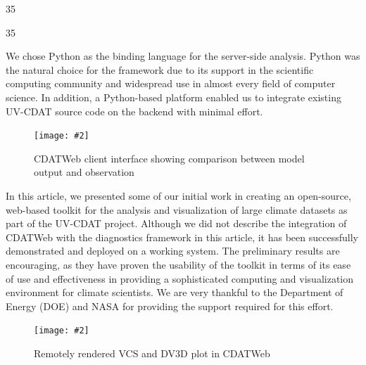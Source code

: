 \documentclass[a0,landscape]{a0poster}
\newenvironment{pcol}[1]{
  \begin{minipage}[t]{#1}
}{
  \end{minipage}
}
\newcommand{\myfig}[3][0]{
\begin{center}
  \vspace{0.7cm}
  \texttt{[image: \#2]}
  \nobreak
\end{center}}
\begin{document}
\begin{textblock}{35}
\begin{pcol}{\threecolwidth}
\begin{textblock}{35}
\begin{pcol}{35cm}
We chose Python as the binding language for the server-side analysis. Python was the natural choice for the framework due to its support in the scientific computing community and widespread use in almost every field of computer science. In addition, a Python-based platform enabled us to integrate existing UV-CDAT source code on the backend with minimal effort.

\begin{figure}[montage]
  \vspace{0.7cm}
  \myfig[0]{images/vcs_plots}{0.80}
  \caption{CDATWeb client interface showing comparison between model output and observation}
\end{figure}


In this article, we presented some of our initial work in creating an open-source, web-based toolkit for the analysis and visualization of large climate datasets as part of the UV-CDAT project.  Although we did not describe the integration of CDATWeb with the diagnostics framework in this article, it has been successfully demonstrated and deployed on a working system. The preliminary results are encouraging, as they have proven the usability of the toolkit in terms of its ease of use and effectiveness in providing a sophisticated computing and visualization environment for climate scientists.  We are very thankful to the Department of Energy (DOE) and NASA for providing the support required for this effort.

\begin{figure}[floodmap]
\myfig[1]{images/dv3d_plots}{0.80}
\caption{Remotely rendered VCS and DV3D plot in CDATWeb}
\end{figure}

\end{pcol}
\end{textblock}

\large
\end{pcol}
\end{textblock}
\end{document}
